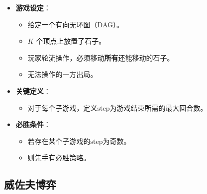 \documentclass[a4paper,12pt]{article}
\begin{document}
\begin{itemize}
    \item \textbf{游戏设定}：
    \begin{itemize}
        \item 给定一个有向无环图（DAG）。
        \item $K$ 个顶点上放置了石子。
        \item 玩家轮流操作，必须移动\textbf{所有}还能移动的石子。
        \item 无法操作的一方出局。
    \end{itemize}
    
    \item \textbf{关键定义}：
    \begin{itemize}
        \item 对于每个子游戏，定义$\text{step}$为游戏结束所需的最大回合数。
    \end{itemize}
    
    \item \textbf{必胜条件}：
    \begin{itemize}
        \item 若存在某个子游戏的$\text{step}$为奇数。
        \item 则先手有必胜策略。
    \end{itemize}
\end{itemize}

\subsection{威佐夫博弈}
\end{document}
